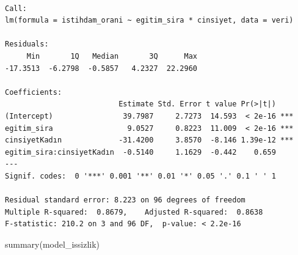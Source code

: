 \documentclass[
  11pt,
  a4paper,
  DIV=11,
  numbers=noendperiod]{scrartcl}
\newenvironment{Shaded}{\begin{snugshade}}{\end{snugshade}}
\newcommand{\AttributeTok}[1]{\textcolor[rgb]{0.40,0.45,0.13}{#1}}
\newcommand{\CommentTok}[1]{\textcolor[rgb]{0.37,0.37,0.37}{#1}}
\newcommand{\FunctionTok}[1]{\textcolor[rgb]{0.28,0.35,0.67}{#1}}
\newcommand{\NormalTok}[1]{\textcolor[rgb]{0.00,0.23,0.31}{#1}}
\newcommand{\OtherTok}[1]{\textcolor[rgb]{0.00,0.23,0.31}{#1}}
\newcommand{\SpecialCharTok}[1]{\textcolor[rgb]{0.37,0.37,0.37}{#1}}
\begin{document}
\begin{Shaded}
\end{Shaded}

\begin{verbatim}

Call:
lm(formula = istihdam_orani ~ egitim_sira * cinsiyet, data = veri)

Residuals:
     Min       1Q   Median       3Q      Max 
-17.3513  -6.2798  -0.5857   4.2327  22.2960 

Coefficients:
                          Estimate Std. Error t value Pr(>|t|)    
(Intercept)                39.7987     2.7273  14.593  < 2e-16 ***
egitim_sira                 9.0527     0.8223  11.009  < 2e-16 ***
cinsiyetKadın             -31.4200     3.8570  -8.146 1.39e-12 ***
egitim_sira:cinsiyetKadın  -0.5140     1.1629  -0.442    0.659    
---
Signif. codes:  0 '***' 0.001 '**' 0.01 '*' 0.05 '.' 0.1 ' ' 1

Residual standard error: 8.223 on 96 degrees of freedom
Multiple R-squared:  0.8679,    Adjusted R-squared:  0.8638 
F-statistic: 210.2 on 3 and 96 DF,  p-value: < 2.2e-16
\end{verbatim}

\begin{Shaded}
\begin{Highlighting}[]
\FunctionTok{summary}\NormalTok{(model\_issizlik)}
\end{Highlighting}
\end{Shaded}
\end{document}
